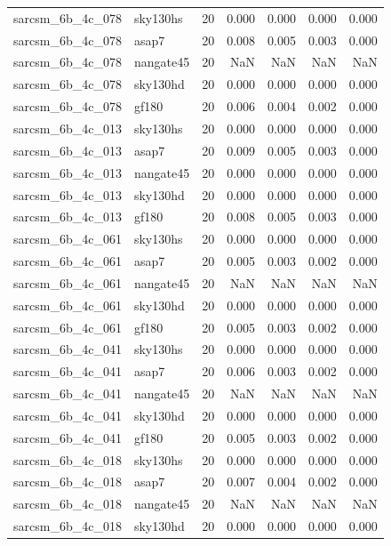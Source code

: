 \begin{tabular}{llrrrrr}
sarcsm\_6b\_4c\_078 & sky130hs & 20 & 0.000 & 0.000 & 0.000 & 0.000 \\
sarcsm\_6b\_4c\_078 & asap7 & 20 & 0.008 & 0.005 & 0.003 & 0.000 \\
sarcsm\_6b\_4c\_078 & nangate45 & 20 & NaN & NaN & NaN & NaN \\
sarcsm\_6b\_4c\_078 & sky130hd & 20 & 0.000 & 0.000 & 0.000 & 0.000 \\
sarcsm\_6b\_4c\_078 & gf180 & 20 & 0.006 & 0.004 & 0.002 & 0.000 \\
sarcsm\_6b\_4c\_013 & sky130hs & 20 & 0.000 & 0.000 & 0.000 & 0.000 \\
sarcsm\_6b\_4c\_013 & asap7 & 20 & 0.009 & 0.005 & 0.003 & 0.000 \\
sarcsm\_6b\_4c\_013 & nangate45 & 20 & 0.000 & 0.000 & 0.000 & 0.000 \\
sarcsm\_6b\_4c\_013 & sky130hd & 20 & 0.000 & 0.000 & 0.000 & 0.000 \\
sarcsm\_6b\_4c\_013 & gf180 & 20 & 0.008 & 0.005 & 0.003 & 0.000 \\
sarcsm\_6b\_4c\_061 & sky130hs & 20 & 0.000 & 0.000 & 0.000 & 0.000 \\
sarcsm\_6b\_4c\_061 & asap7 & 20 & 0.005 & 0.003 & 0.002 & 0.000 \\
sarcsm\_6b\_4c\_061 & nangate45 & 20 & NaN & NaN & NaN & NaN \\
sarcsm\_6b\_4c\_061 & sky130hd & 20 & 0.000 & 0.000 & 0.000 & 0.000 \\
sarcsm\_6b\_4c\_061 & gf180 & 20 & 0.005 & 0.003 & 0.002 & 0.000 \\
sarcsm\_6b\_4c\_041 & sky130hs & 20 & 0.000 & 0.000 & 0.000 & 0.000 \\
sarcsm\_6b\_4c\_041 & asap7 & 20 & 0.006 & 0.003 & 0.002 & 0.000 \\
sarcsm\_6b\_4c\_041 & nangate45 & 20 & NaN & NaN & NaN & NaN \\
sarcsm\_6b\_4c\_041 & sky130hd & 20 & 0.000 & 0.000 & 0.000 & 0.000 \\
sarcsm\_6b\_4c\_041 & gf180 & 20 & 0.005 & 0.003 & 0.002 & 0.000 \\
sarcsm\_6b\_4c\_018 & sky130hs & 20 & 0.000 & 0.000 & 0.000 & 0.000 \\
sarcsm\_6b\_4c\_018 & asap7 & 20 & 0.007 & 0.004 & 0.002 & 0.000 \\
sarcsm\_6b\_4c\_018 & nangate45 & 20 & NaN & NaN & NaN & NaN \\
sarcsm\_6b\_4c\_018 & sky130hd & 20 & 0.000 & 0.000 & 0.000 & 0.000 \\

\end{tabular}
